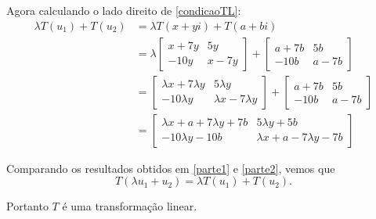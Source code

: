 \documentclass[12pt]{exam}
\begin{document}
    Agora calculando o lado direito de \eqref{condicaoTL}:
    \begin{align}\label{parte2}
        \lambda T(u_1) + T(u_2) & = \lambda T(x + yi) + T(a + bi)\nonumber \\ &= \lambda\begin{bmatrix}x + 7y & 5y\\-10y & x - 7y\end{bmatrix} + \begin{bmatrix}a + 7b & 5b\\-10b & a - 7b\end{bmatrix}\nonumber \\ &= \begin{bmatrix}\lambda x + 7\lambda y & 5\lambda y\\-10\lambda y & \lambda x - 7\lambda y\end{bmatrix} + \begin{bmatrix}a + 7b & 5b\\-10b & a - 7b\end{bmatrix}\nonumber \\ &= \begin{bmatrix}\lambda x + a + 7\lambda y + 7b & 5\lambda y + 5b\\-10\lambda y -10b & \lambda x + a - 7\lambda y - 7b\end{bmatrix}
    \end{align}

    Comparando os resultados obtidos em \eqref{parte1} e \eqref{parte2}, vemos que
    \[
        T(\lambda u_1 + u_2) = \lambda T(u_1) + T(u_2).
    \]

    Portanto $T$ é uma transformação linear.
\end{document}
